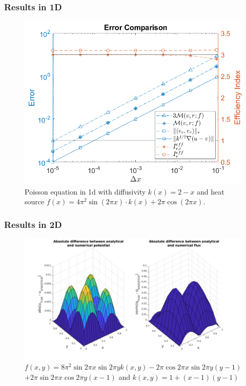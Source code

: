 \documentclass[t]{beamer}
\begin{document}
\begin{frame}
\frametitle{Results in 1D }
\vspace{-18pt}
\begin{figure}[t]
\centering
\includegraphics[width = 0.7\linewidth]{convergenceplot_k_f_non_constant.png}
\caption{Poisson equation in 1d with diffusivity $k(x) = 2-x$ and heat source $f(x) = 4\pi^2\sin(2\pi x)\cdot k(x) + 2\pi\cos(2\pi x)$.}
\label{fig:Convergence1d}
\end{figure}

\end{frame}

\begin{frame}
\frametitle{Results in 2D}
\begin{figure}
\centering
\includegraphics[width = 0.9\linewidth]{../../Images/absnorm.jpg}
\caption{$f(x,y) = 8\pi^2\sin{2\pi x}\sin{2\pi y}k(x,y) - 2\pi\cos{2\pi x}\sin{2\pi y}(y-1)$ $+ 2\pi\sin{2\pi x}\cos{2\pi y}(x-1) $ and 
		$k(x,y) = 1 + (x-1)(y-1)$}
\end{figure}	
\end{frame}
\end{document}
